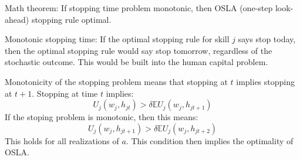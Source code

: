 \documentclass[10 pt]{article}
\begin{document}
Math theorem: If stopping time problem monotonic, then OSLA (one-step look-ahead) stopping rule optimal. 
\begin{blist}

\item Monotonic stopping time: If the optimal stopping rule for skill $j$ says stop today, then the optimal stopping rule would say stop tomorrow, regardless of the stochastic outcome. This would be built into the human capital problem. 

\item Monotonicity of the stopping problem means that stopping at $t$ implies stopping at $t+1$. Stopping at time $t$ implies: 
\begin{equation*}
 U_j(w_j, h_{jt}) > \delta \mathbb{E} U_j(w_j, h_{jt+1})
\end{equation*}
If the stoping problem is monotonic, then this means: 
\begin{equation*}
 U_j(w_j, h_{jt+1}) > \delta \mathbb{E} U_j(w_j, h_{jt+2})
\end{equation*}
This holds for all realizations of $a$. 
This condition then implies the optimality of OSLA.


\end{blist}
\end{document}
